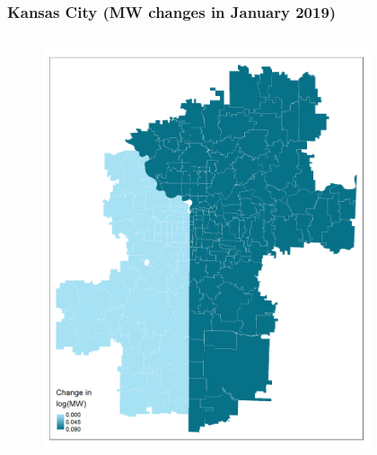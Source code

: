\documentclass[aspectratio=169, t]{beamer}
\begin{document}
\begin{frame}[label = kc_example]
\frametitle{Kansas City (MW changes in January 2019)}
    \begin{columns}
        \begin{column}{0.50\textwidth}
            \vspace{-4mm}
            \begin{figure}
                \centering
                \includegraphics[scale = 0.36]{maps_events/output/kc_2018-12_actual_mw.png}
            \end{figure}   
        \end{column}
        \begin{column}{0.50\textwidth}
            \vspace{-4mm}
            \begin{figure}
                \centering

\end{figure}
\end{column}
\end{columns}
\end{frame}
\end{document}
